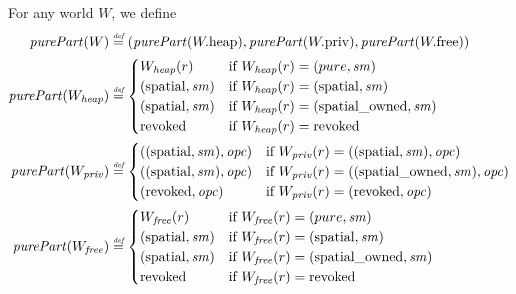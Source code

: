 \begin{definition}
  \label{def:purePart}
  For any world $W$, we define
  \begin{align*}
    \purePart{W} &\defeq (\purePart{\pwheap},\purePart{\pwpriv},\purePart{\pwfree})\\
    \purePart{W_\var{heap}} &\defeq
                       \begin{cases}
                         W_{\var{heap}}(r) & \text{if } W_\var{heap}(r) = (pure,\var{sm})\\
                         (\spatial,\var{sm}) & \text{if } W_\var{heap}(r) = (\spatial,\var{sm})\\
                         (\spatial,\var{sm}) & \text{if } W_\var{heap}(r) = (\spatialo,\var{sm})\\
                         \revoked & \text{if } W_\var{heap}(r) = \revoked\\
                       \end{cases}\\
    \purePart{W_\var{priv}} &\defeq
                       \begin{cases}
                         ((\spatial,\var{sm}),\opc) & \text{if } W_\var{priv}(r) = ((\spatial,\var{sm}),\opc)\\
                         ((\spatial,\var{sm}),\opc) & \text{if } W_\var{priv}(r) = ((\spatialo,\var{sm}),\opc)\\
                         (\revoked,\opc) & \text{if } W_\var{priv}(r) = (\revoked,\opc)\\
                       \end{cases}\\
    \purePart{W_\var{free}} &\defeq
                       \begin{cases}
                         W_{\var{free}}(r) & \text{if } W_{\var{free}}(r) = (pure,\var{sm})\\
                         (\spatial,\var{sm}) & \text{if } W_{\var{free}}(r) = (\spatial,\var{sm})\\
                         (\spatial,\var{sm}) & \text{if } W_{\var{free}}(r) = (\spatialo,\var{sm})\\
                         \revoked & \text{if } W_{\var{free}}(r) = \revoked\\
                       \end{cases}
  \end{align*}
\end{definition}

